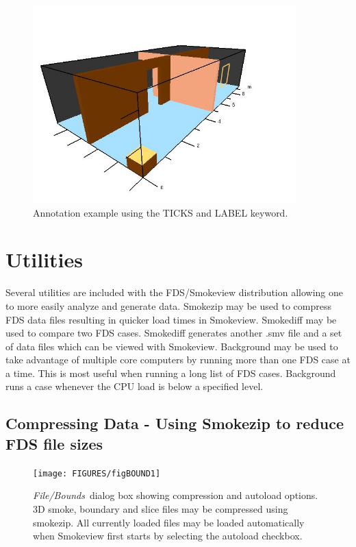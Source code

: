 \documentclass[11pt,twoside]{book}
\begin{document}
\begin{figure}[\figoptions]
\begin{center}
\includegraphics[height=3.0in]{FIGURES/ticklabels}
\end{center}
\caption{ Annotation example using the TICKS and LABEL keyword. }
\label{figticklabelexample}%
\end{figure}

\chapter{Utilities}
Several utilities are included with the FDS/Smokeview distribution allowing one
to more easily analyze and generate data.  Smokezip may be used to compress
FDS data files resulting in quicker load times in Smokeview.  Smokediff may be used
to compare two FDS cases.  Smokediff generates another .smv file and a set of data files
which can be viewed with Smokeview.  Background may be used to take advantage of multiple
core computers by running more than one FDS case at a time.  This is most useful when running
a long list of FDS cases. Background runs a case whenever the CPU load is below a specified level.


\section{Compressing Data - Using Smokezip to reduce FDS file sizes}
\label{ch:smokezip}

\begin{figure}[\figoptions]
\centerline{\texttt{[image: FIGURES/figBOUND1]} }
\caption[{\em Compress Files}\ and {\em Autoload}\ dialog box.] {{\em File/Bounds}\ dialog
box showing compression and autoload options.  3D smoke,  boundary and slice
files may be compressed using smokezip.  All currently loaded
files may be loaded automatically when Smokeview first starts by
selecting the autoload checkbox.} \label{figBOUNDScompress}
\end{figure}
\end{document}
